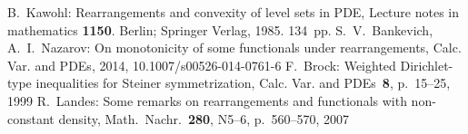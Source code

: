 \begin{thebibliography}{99}
 B.~Kawohl: Rearrangements and convexity of level sets in PDE,
Lecture notes in mathematics {\bf1150}. Berlin; Springer Verlag, 1985. 134~pp.
 S.~V.~Bankevich, A.~I.~Nazarov: On monotonicity of some functionals under rearrangements, Calc. Var. and PDEs, 2014, 10.1007/s00526-014-0761-6
 F.~Brock: Weighted Dirichlet-type inequalities for Steiner symmetrization,
Calc. Var. and PDEs~{\bf8}, p.~15--25, 1999
 R.~Landes: Some remarks on rearrangements and functionals with non-constant density,
Math.~Nachr.~{\bf280}, N5--6, p.~560--570, 2007
\end{thebibliography}
